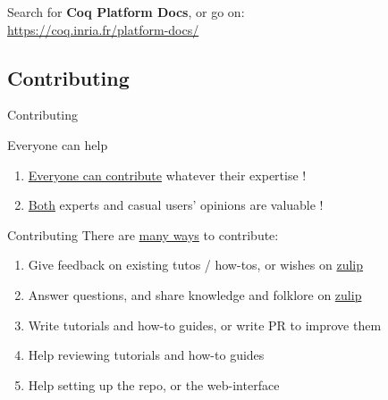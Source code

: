 \documentclass[10pt]{beamer}
\begin{document}
\begin{frame}
  \begin{center}
    \large
    Search for \textbf{Coq Platform Docs}, or go on: \\
    \textcolor{blue}{\url{https://coq.inria.fr/platform-docs/}}
  \end{center}
\end{frame}


\subsection{Contributing}


\begin{frame}{Contributing}
  \begin{tcbObj}{Everyone can help}
    \begin{enumerate}
      \item<1-> \ul{Everyone can contribute} whatever their expertise !
      \item<2-> \ul{Both} experts and casual users' opinions are valuable !
    \end{enumerate}
  \end{tcbObj}
  \begin{tcbProp}{Contributing}
    There are \ul{many ways} to contribute:
    \begin{enumerate}
      \item<3-> Give feedback on existing tutos / how-tos, or wishes on
      \textcolor{blue}{\href{https://www.theozimmermann.net/platform-docs/}{zulip}}
      \item<4-> Answer questions, and share knowledge and folklore on
      \textcolor{blue}{\href{https://www.theozimmermann.net/platform-docs/}{zulip}}
      \item<5-> Write tutorials and how-to guides, or write PR to improve them
      \item<6-> Help reviewing tutorials and how-to guides
      \item<7-> Help setting up the repo, or the web-interface
    \end{enumerate}
  \end{tcbProp}
\end{frame}
\end{document}
